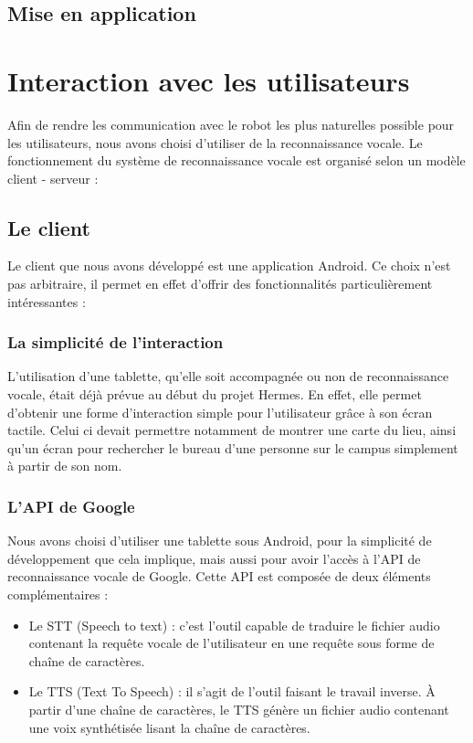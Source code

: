 \documentclass{report}
\begin{document}
        \subsection{Mise en application}




    \section{Interaction avec les utilisateurs}

      {Afin de rendre les communication avec le robot les plus naturelles possible
      pour les utilisateurs, nous avons choisi d'utiliser de la reconnaissance vocale.
      Le fonctionnement du système de reconnaissance vocale est organisé selon
      un modèle client - serveur :}

      \subsection{Le client}
      {Le client que nous avons développé est une application Android. Ce choix n'est
      pas arbitraire, il permet en effet d'offrir des fonctionnalités particulièrement
      intéressantes :}

        \subsubsection{La simplicité de l'interaction}
        {L'utilisation d'une tablette, qu'elle soit accompagnée ou non de reconnaissance
        vocale, était déjà prévue au début du projet Hermes. En effet, elle permet
        d'obtenir une forme d'interaction simple pour l'utilisateur grâce à son écran tactile.
        Celui ci devait permettre notamment de montrer une carte du lieu, ainsi qu'un écran
        pour rechercher le bureau d'une personne sur le campus simplement à partir de son
        nom.}

        \subsubsection{L'API de Google}
        {Nous avons choisi d'utiliser une tablette sous Android, pour la simplicité de
        développement que cela implique, mais aussi pour avoir l'accès à l'API de reconnaissance
        vocale de Google. Cette API est composée de deux éléments complémentaires :}
        \begin{itemize}
          \item Le STT (Speech to text) : c'est l'outil capable de traduire le fichier
          audio contenant la requête vocale de l'utilisateur en une requête sous forme de
          chaîne de caractères.
          \item Le TTS (Text To Speech) : il s'agit de l'outil faisant le travail inverse.
          À partir d'une chaîne de caractères, le TTS génère un fichier audio contenant une
          voix synthétisée lisant la chaîne de caractères.
        \end{itemize}
\end{document}
